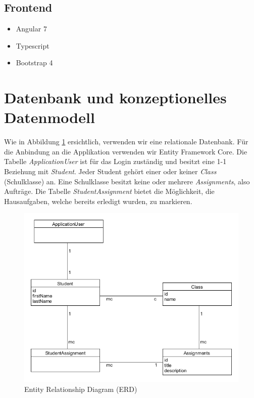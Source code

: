 \documentclass[a4paper, titlepage]{article}
\begin{document}
    \subsection{Frontend}
    \begin{itemize}
    \item Angular 7
    \item Typescript
    \item Bootstrap 4
    \end{itemize}

    \section{Datenbank und konzeptionelles Datenmodell}
    Wie in Abbildung \ref{erd} ersichtlich, verwenden wir eine relationale Datenbank. Für die Anbindung an die Applikation
    verwenden wir Entity Framework Core. Die Tabelle \emph{ApplicationUser}
    ist für das Login zuständig und besitzt eine 1-1 Beziehung mit \emph{Student}.
    Jeder Student gehört einer oder keiner \emph{Class} (Schulklasse) an. Eine Schulklasse besitzt
    keine oder mehrere \emph{Assignments}, also Aufträge. Die Tabelle \emph{StudentAssignment}
    bietet die Möglichkeit, die Hausaufgaben, welche bereits erledigt wurden,
    zu markieren.
    \begin{figure}
        \includegraphics[width=\textwidth]{uml}
        \caption{Entity Relationship Diagram (ERD)}
        \label{erd}
    \end{figure}
\end{document}
